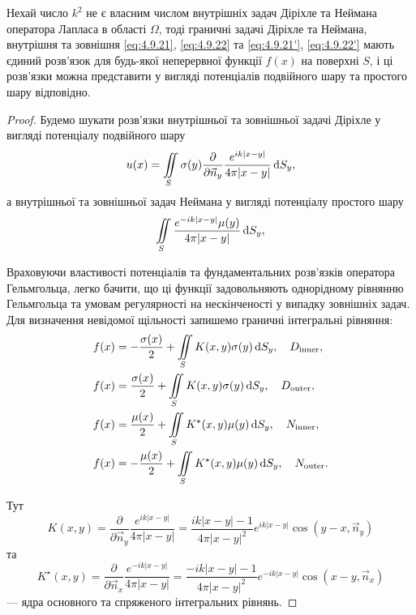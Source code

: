 \begin{theorem}
	Нехай число $k^2$ не є власним числом внутрішніх задач Діріхле та Неймана оператора Лапласа в області $\Omega$, тоді граничні задачі Діріхле та Неймана, внутрішня та зовнішня \eqref{eq:4.9.21}, \eqref{eq:4.9.22} та \eqref{eq:4.9.21'}, \eqref{eq:4.9.22'} мають єдиний розв'язок для будь-якої неперервної функції $f(x)$ на поверхні $S$, і ці розв'язки можна представити у вигляді потенціалів подвійного шару та простого шару відповідно.
\end{theorem}

\begin{proof}
	Будемо шукати розв'язки внутрішньої та зовнішньої задачі Діріхле у вигляді потенціалу подвійного шару
	\begin{equation}
		\label{eq:4.9.23}
		u(x) = \displaystyle\iint\limits_S \sigma(y) \frac{\partial}{\partial \vec n_y} \frac{e^{i k |x - y|}}{4 \pi |x - y|} \mathop{}\!\mathrm{d} S_y,
	\end{equation}
	а внутрішньої та зовнішньої задач Неймана у вигляді потенціалу простого шару
	\begin{equation}
		\label{eq:4.9.24}
		\displaystyle\iint\limits_S \frac{e^{- i k |x - y|} \mu(y)}{4 \pi |x - y|} \mathop{}\!\mathrm{d} S_y,
	\end{equation}

	Враховуючи властивості потенціалів та фундаментальних розв'язків оператора Гельмгольца, легко бачити, що ці функції задовольняють однорідному рівнянню Гельмгольца та умовам регулярності на нескінченості у випадку зовнішніх задач.
	Для визначення невідомої щільності запишемо граничні інтегральні рівняння:
	\begin{align}
		\label{eq:4.9.25}
		& f(x) = - \frac{\sigma(x)}{2} + \displaystyle\iint\limits_S K(x, y) \sigma(y) \mathop{}\!\mathrm{d} S_y, \quad D_{\text{inner}}, \\
		\label{eq:4.9.25'}
		& f(x) = \frac{\sigma(x)}{2} + \displaystyle\iint\limits_S K(x, y) \sigma(y) \mathop{}\!\mathrm{d} S_y, \quad D_{\text{outer}}, \\
		\label{eq:4.9.26}
		& f(x) = \frac{\mu(x)}{2} + \displaystyle\iint\limits_S K^\star(x, y) \mu(y) \mathop{}\!\mathrm{d} S_y, \quad N_{\text{inner}}, \\
		\label{eq:4.9.26'}
		& f(x) = - \frac{\mu(x)}{2} + \displaystyle\iint\limits_S K^\star(x, y) \mu(y) \mathop{}\!\mathrm{d} S_y, \quad N_{\text{outer}}.
	\end{align}

	Тут
	\begin{equation}
		\label{eq:4.9.27}
		K(x, y) = \frac{\partial}{\partial \vec n_y} \frac{e^{ik|x - y|}}{4 \pi |x - y|} = \frac{i k |x - y| - 1}{4 \pi |x - y|^2} e^{i k|x - y|} \cos(y - x, \vec n_y)
	\end{equation}
	та
	\begin{equation}
		\label{eq:4.9.27'}
		K^\star(x, y) = \frac{\partial}{\partial \vec n_x} \frac{e^{-ik|x - y|}}{4 \pi |x - y|} = \frac{- i k |x - y| - 1}{4 \pi |x - y|^2} e^{- i k|x - y|} \cos(x - y, \vec n_x)
	\end{equation}
	--- ядра основного та спряженого інтегральних рівнянь. \medskip


\end{proof}
